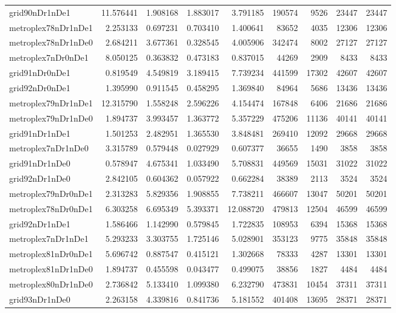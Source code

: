 \begin{longtable}{|l|r|r|r|r|r|r|r|r|}
grid90nDr1nDe1 & 11.576441 & 1.908168 & 1.883017 & 3.791185 & 190574 & 9526 & 23447 & 23447 \\
metroplex78nDr1nDe1 & 2.253133 & 0.697231 & 0.703410 & 1.400641 & 83652 & 4035 & 12306 & 12306 \\
metroplex78nDr1nDe0 & 2.684211 & 3.677361 & 0.328545 & 4.005906 & 342474 & 8002 & 27127 & 27127 \\
metroplex7nDr0nDe1 & 8.050125 & 0.363832 & 0.473183 & 0.837015 & 44269 & 2909 & 8433 & 8433 \\
grid91nDr0nDe1 & 0.819549 & 4.549819 & 3.189415 & 7.739234 & 441599 & 17302 & 42607 & 42607 \\
grid92nDr0nDe1 & 1.395990 & 0.911545 & 0.458295 & 1.369840 & 84964 & 5686 & 13436 & 13436 \\
metroplex79nDr1nDe1 & 12.315790 & 1.558248 & 2.596226 & 4.154474 & 167848 & 6406 & 21686 & 21686 \\
metroplex79nDr1nDe0 & 1.894737 & 3.993457 & 1.363772 & 5.357229 & 475206 & 11136 & 40141 & 40141 \\
grid91nDr1nDe1 & 1.501253 & 2.482951 & 1.365530 & 3.848481 & 269410 & 12092 & 29668 & 29668 \\
metroplex7nDr1nDe0 & 3.315789 & 0.579448 & 0.027929 & 0.607377 & 36655 & 1490 & 3858 & 3858 \\
grid91nDr1nDe0 & 0.578947 & 4.675341 & 1.033490 & 5.708831 & 449569 & 15031 & 31022 & 31022 \\
grid92nDr1nDe0 & 2.842105 & 0.604362 & 0.057922 & 0.662284 & 38389 & 2113 & 3524 & 3524 \\
metroplex79nDr0nDe1 & 2.313283 & 5.829356 & 1.908855 & 7.738211 & 466607 & 13047 & 50201 & 50201 \\
metroplex78nDr0nDe1 & 6.303258 & 6.695349 & 5.393371 & 12.088720 & 479813 & 12504 & 46599 & 46599 \\
grid92nDr1nDe1 & 1.586466 & 1.142990 & 0.579845 & 1.722835 & 108953 & 6394 & 15368 & 15368 \\
metroplex7nDr1nDe1 & 5.293233 & 3.303755 & 1.725146 & 5.028901 & 353123 & 9775 & 35848 & 35848 \\
metroplex81nDr0nDe1 & 5.696742 & 0.887547 & 0.415121 & 1.302668 & 78333 & 4287 & 13301 & 13301 \\
metroplex81nDr1nDe0 & 1.894737 & 0.455598 & 0.043477 & 0.499075 & 38856 & 1827 & 4484 & 4484 \\
metroplex80nDr1nDe0 & 2.736842 & 5.133410 & 1.099380 & 6.232790 & 473831 & 10454 & 37311 & 37311 \\
grid93nDr1nDe0 & 2.263158 & 4.339816 & 0.841736 & 5.181552 & 401408 & 13695 & 28371 & 28371 \\

\end{longtable}
